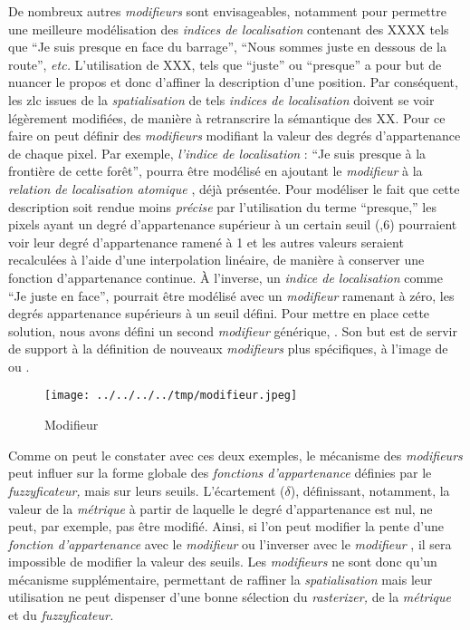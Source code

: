 De nombreux autres \emph{modifieurs} sont envisageables, notamment
pour permettre une meilleure modélisation des \emph{indices de
  localisation} contenant des XXXX tels que \enquote{Je suis presque
  en face du barrage}, \enquote{Nous sommes juste en dessous de la
  route}, \emph{etc.} L'utilisation de XXX, tels que \enquote{juste}
ou \enquote{presque} a pour but de nuancer le propos et donc d'affiner
la description d'une position. Par conséquent, les \ac{zlc} issues de
la \emph{spatialisation} de tels \emph{indices de localisation}
doivent se voir légèrement modifiées, de manière à retranscrire la
sémantique des XX. Pour ce faire on peut définir des \emph{modifieurs}
modifiant la valeur des degrés d'appartenance de chaque pixel. Par
exemple, \emph{l'indice de localisation} : \enquote{Je suis presque à
  la frontière de cette forêt}, pourra être modélisé en ajoutant le
\emph{modifieur} \onto[Presque] à la \emph{relation de localisation
  atomique} , déjà présentée. Pour
modéliser le fait que cette description soit rendue moins
\emph{précise} par l'utilisation du terme \enquote{presque,} les
pixels ayant un degré d'appartenance supérieur à un certain seuil (,6) pourraient voir leur degré d'appartenance ramené à 1 et les
autres valeurs seraient recalculées à l'aide d'une interpolation
linéaire, de manière à conserver une fonction d'appartenance
continue. À l'inverse, un \emph{indice de localisation} comme
\enquote{Je juste en face}, pourrait être modélisé avec un
\emph{modifieur} ramenant à zéro, les degrés appartenance supérieurs à
un seuil défini. Pour mettre en place cette solution, nous avons
défini un second \emph{modifieur} générique, . Son
but est de servir de support à la définition de nouveaux
\emph{modifieurs} plus spécifiques, à l'image de  ou
.

\begin{figure}
  \centering
  \texttt{[image: ../../../../tmp/modifieur.jpeg]}
  \caption{Modifieur}
  \label{fig:methode_modifieur}
\end{figure}

Comme on peut le constater avec ces deux exemples, le mécanisme des
\emph{modifieurs} peut influer sur la forme globale des
\emph{fonctions d'appartenance} définies par le \emph{fuzzyficateur,}
mais sur leurs seuils. L'écartement (\(\delta\)), définissant,
notamment, la valeur de la \emph{métrique} à partir de laquelle le
degré d'appartenance est nul, ne peut, par exemple, pas être
modifié. Ainsi, si l'on peut modifier la pente d'une \emph{fonction
  d'appartenance} avec le \emph{modifieur}  ou
l'inverser avec le \emph{modifieur} , il sera impossible de
modifier la valeur des seuils. Les \emph{modifieurs} ne sont donc
qu'un mécanisme supplémentaire, permettant de raffiner la
\emph{spatialisation} mais leur utilisation ne peut dispenser d'une
bonne sélection du \emph{rasterizer,} de la \emph{métrique} et du
\emph{fuzzyficateur.}

